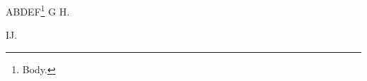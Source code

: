 \documentclass{article}
\begin{document}
A\footnotemark[\value{nosuch}] B\footnotemark[\relax] D\footnotemark[2\relax] E\footnotemark[$\dagger$]
F\footnote[\relax]{Body.}
G\setcounter{footnote}{\value{nosuchb}} H\setcounter{footnote}{\relax}.

\renewcommand\thefootnote{\fnsymbol{footnote}}I\footnotemark[\value{nosuchc}] J\footnotemark[2].
\end{document}
